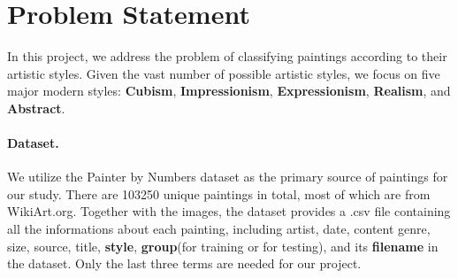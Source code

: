 \section{Problem Statement} \label{sec:statement}
In this project, we address the problem of classifying paintings according to
their artistic styles. Given the vast number of possible artistic styles, we
focus on five major modern styles: \textbf{Cubism}, \textbf{Impressionism},
\textbf{Expressionism}, \textbf{Realism}, and \textbf{Abstract}.
\paragraph{Dataset.}
We utilize the Painter by Numbers dataset \cite{painter_by_numbers} as the
primary source of paintings for our study. There are 103250 unique paintings in
total, most of which are from WikiArt.org. Together with the images, the
dataset provides a .csv file containing all the informations about each
painting, including artist, date, content genre, size, source, title,
\textbf{style}, \textbf{group}(for training or for testing), and its
\textbf{filename} in the dataset. Only the last three terms are needed for our
project.

